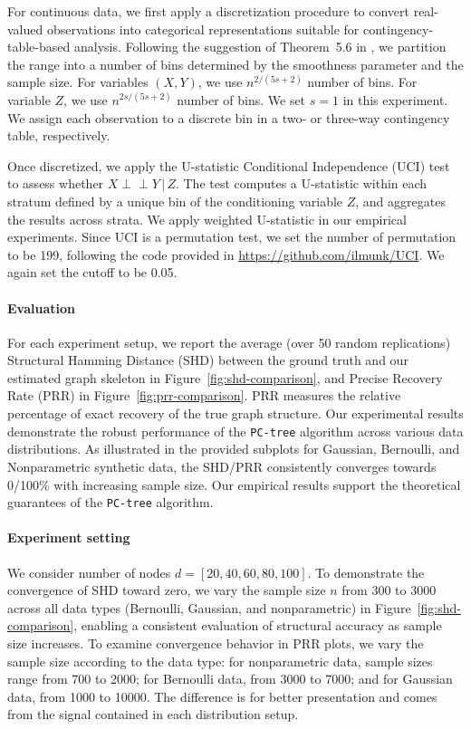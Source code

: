 \documentclass{article}
\theoremstyle{definition}
\theoremstyle{definition}
\theoremstyle{definition}
\theoremstyle{definition}
\theoremstyle{definition}
\theoremstyle{definition}
\theoremstyle{remark}
\theoremstyle{remark}
\newcommand{\given}{\,|\,}
\newcommand{\indep}{\perp \!\!\! \perp }
\begin{document}
For continuous data, we first apply a discretization procedure to convert real-valued observations into categorical representations suitable for contingency-table-based analysis.
Following the suggestion of Theorem~5.6 in \citet{neykov2021minimax}, we 
partition the range into a number of bins determined by the smoothness parameter and the sample size. For variables $(X, Y)$, we use $n^{2/(5s+2)}$ number of bins. For variable $Z$, we use $n^{2s / (5s+2)}$ number of bins. We set $s=1$ in this experiment.
We assign each observation to a discrete bin in a two- or three-way contingency table, respectively. 

Once discretized, we apply the U-statistic Conditional Independence (UCI) test \citep{kim2024conditional} to assess whether $X \indep Y \given Z$. The test computes a U-statistic within each stratum defined by a unique bin of the conditioning variable $Z$, and aggregates the results across strata.
We apply weighted U-statistic in our empirical experiments. 
Since UCI is a permutation test, we set the number of permutation to be 199, following the code provided in \url{https://github.com/ilmunk/UCI}.
We again set the cutoff to be 0.05.


\paragraph{Evaluation}
For each experiment setup, 
we report the average (over 50 random replications) Structural Hamming Distance (SHD) between the ground truth and our estimated graph skeleton in Figure~\ref{fig:shd-comparison}, 
and Precise Recovery Rate (PRR) in Figure~\ref{fig:prr-comparison}. PRR measures the relative percentage of exact recovery of the true graph structure. Our experimental results demonstrate the robust performance of the \texttt{PC-tree} algorithm across various data distributions. As illustrated in the provided subplots for Gaussian, Bernoulli, and Nonparametric synthetic data, the SHD/PRR consistently converges towards 0/100\% with increasing sample size. Our empirical results support the theoretical guarantees of the \texttt{PC-tree} algorithm. 

\paragraph{Experiment setting}
We consider number of nodes $d=[20, 40, 60, 80, 100]$.
To demonstrate the convergence of SHD toward zero, we vary the sample size $n$ from 300 to 3000 across all data types (Bernoulli, Gaussian, and nonparametric) in Figure~\ref{fig:shd-comparison}, enabling a consistent evaluation of structural accuracy as sample size increases. 
To examine convergence behavior in PRR plots, we vary the sample size according to the data type: for nonparametric data, sample sizes range from 700 to 2000; for Bernoulli data, from 3000 to 7000; and for Gaussian data, from 1000 to 10000. 
The difference is for better presentation and comes from the signal contained in each distribution setup.
\end{document}
